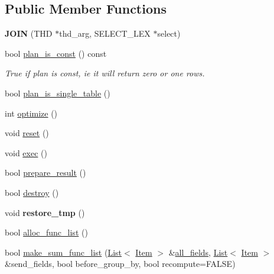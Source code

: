 \subsection*{Public Member Functions}
\begin{DoxyCompactItemize}
\item 
\mbox{\label{classJOIN_ae61cb563ddbc36edfe43024c8a479190}} 
{\bfseries J\+O\+IN} (T\+HD $\ast$thd\+\_\+arg, S\+E\+L\+E\+C\+T\+\_\+\+L\+EX $\ast$select)
\item 
\mbox{\label{classJOIN_a3bba78a49b4feb9f60e1044471c41126}} 
bool \mbox{\hyperlink{classJOIN_a3bba78a49b4feb9f60e1044471c41126}{plan\+\_\+is\+\_\+const}} () const
\begin{DoxyCompactList}\small\item\em True if plan is const, ie it will return zero or one rows. \end{DoxyCompactList}\item 
bool \mbox{\hyperlink{classJOIN_a0c4c676ce74a6a273c6fc5492406e462}{plan\+\_\+is\+\_\+single\+\_\+table}} ()
\item 
int \mbox{\hyperlink{group__Query__Optimizer_ga7f722315c64ce97cff639d705107c660}{optimize}} ()
\item 
void \mbox{\hyperlink{group__Query__Optimizer_gad4e09d71987062663db1836d651ec4d4}{reset}} ()
\item 
void \mbox{\hyperlink{group__Query__Executor_ga31581f58624b85919d7c6cd632157929}{exec}} ()
\item 
bool \mbox{\hyperlink{group__Query__Optimizer_gabed62f6e6cc8f6d042c806a154ea7137}{prepare\+\_\+result}} ()
\item 
bool \mbox{\hyperlink{group__Query__Optimizer_gaf2d76654da99be4012095c016ea5d4d2}{destroy}} ()
\item 
\mbox{\label{classJOIN_a4ce13fe6078588aa794923f13cd47be4}} 
void {\bfseries restore\+\_\+tmp} ()
\item 
bool \mbox{\hyperlink{group__Query__Optimizer_ga140c4ff912190f1c0f6279897103a720}{alloc\+\_\+func\+\_\+list}} ()
\item 
bool \mbox{\hyperlink{group__Query__Optimizer_gae713fbd3faf5b5aefad41408fd11685a}{make\+\_\+sum\+\_\+func\+\_\+list}} (\mbox{\hyperlink{classList}{List}}$<$ \mbox{\hyperlink{classItem}{Item}} $>$ \&\mbox{\hyperlink{classJOIN_a6664196553f3202cfc4e740358d6bc0d}{all\+\_\+fields}}, \mbox{\hyperlink{classList}{List}}$<$ \mbox{\hyperlink{classItem}{Item}} $>$ \&send\+\_\+fields, bool before\+\_\+group\+\_\+by, bool recompute=F\+A\+L\+SE)

\end{DoxyCompactItemize}
